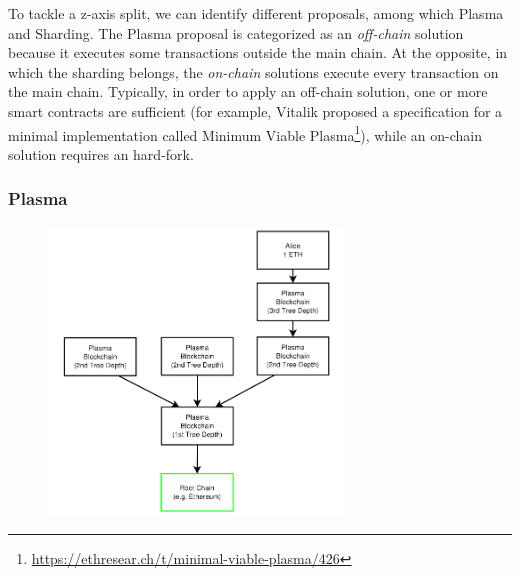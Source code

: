 To tackle a z-axis split, we can identify different proposals, among which
Plasma and Sharding. The Plasma proposal is categorized as an \emph{off-chain}
solution because it executes some transactions outside the main chain. At the
opposite, in which the sharding belongs, the \emph{on-chain} solutions execute
every transaction on the main chain. Typically, in order to apply an off-chain
solution, one or more smart contracts are sufficient (for example, Vitalik
proposed a specification for a minimal implementation called Minimum Viable
Plasma\footnote{\url{https://ethresear.ch/t/minimal-viable-plasma/426}}), while
an on-chain solution requires an hard-fork.

\subsubsection{Plasma}

\begin{figure}[t]
    \begin{center}
        \includegraphics[width=0.7\textwidth]{./res/img/plasma}
        \label{fig:plasma}
    \end{center}
\end{figure}

